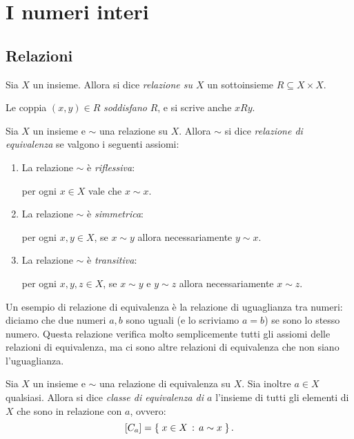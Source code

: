 \chapter{I numeri interi}

\section{Relazioni}

\begin{definition}
    Sia $X$ un insieme. Allora si dice \emph{relazione su $X$} un sottoinsieme $R \subseteq X \times X$. 
    
    Le coppia $(x, y) \in R$ \emph{soddisfano} $R$, e si scrive anche $xRy$. 
\end{definition}

\begin{definition}
    Sia $X$ un insieme e $\sim$ una relazione su $X$. Allora $\sim$ si dice \emph{relazione di equivalenza} se valgono i seguenti assiomi: \begin{enumerate}[label={(EQ\arabic*)}]
        \item La relazione $\sim$ è \emph{riflessiva}:
        
        per ogni $x \in X$ vale che $x \sim x$.
        \item La relazione $\sim$ è \emph{simmetrica}:
        
        per ogni $x, y \in X$, se $x \sim y$ allora necessariamente $y \sim x$.
        \item La relazione $\sim$ è \emph{transitiva}:
        
        per ogni $x, y, z \in X$, se $x \sim y$ e $y \sim z$ allora necessariamente $x \sim z$.
    \end{enumerate}
\end{definition}

Un esempio di relazione di equivalenza è la relazione di uguaglianza tra numeri: diciamo che due numeri $a, b$ sono uguali (e lo scriviamo $a = b$) se sono lo stesso numero. Questa relazione verifica molto semplicemente tutti gli assiomi delle relazioni di equivalenza, ma ci sono altre relazioni di equivalenza che non siano l'uguaglianza.

\begin{definition}
    Sia $X$ un insieme e $\sim$ una relazione di equivalenza su $X$. Sia inoltre $a \in X$ qualsiasi. Allora si dice \emph{classe di equivalenza di $a$} l'insieme di tutti gli elementi di $X$ che sono in relazione con $a$, ovvero: \begin{equation}
        \eqclass*{a} = \set{x \in X \suchthat a \sim x}.
    \end{equation}
\end{definition}

